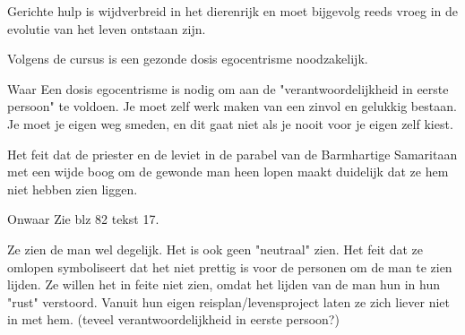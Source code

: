 \documentclass[main.tex]{subfiles}
\begin{document}
\begin{examenvraag}
    \begin{stelling}
        Gerichte hulp is wijdverbreid in het dierenrijk en moet bijgevolg reeds vroeg in de evolutie van het leven ontstaan zijn.
    \end{stelling}

    \begin{antwoord}
    \end{antwoord}
\end{examenvraag}


\begin{examenvraag}
    \begin{stelling}
        Volgens de cursus is een gezonde dosis egocentrisme noodzakelijk.
    \end{stelling}

	 \begin{stelling-antwoord}{Waar}
        Een dosis egocentrisme is nodig om aan de "verantwoordelijkheid in eerste persoon" te voldoen. 
        Je moet zelf werk maken van een zinvol en gelukkig bestaan. 
        Je moet je eigen weg smeden, en dit gaat niet als je nooit voor je eigen zelf kiest.
    \end{stelling-antwoord}
\end{examenvraag}


\begin{examenvraag}
    \begin{stelling}
        Het feit dat de priester en de leviet in de parabel van de Barmhartige Samaritaan met een wijde boog om de gewonde man heen lopen maakt duidelijk dat ze hem niet hebben zien liggen.
    \end{stelling}

	 \begin{stelling-antwoord}{Onwaar}
	   Zie blz 82 tekst 17.
	   
	   Ze zien de man wel degelijk. 
	   Het is ook geen "neutraal" zien.
	   Het feit dat ze omlopen symboliseert dat het niet prettig is voor de personen om de man te zien lijden.
	   Ze willen het in feite niet zien, omdat het lijden van de man hun in hun "rust" verstoord. 
	   Vanuit hun eigen reisplan/levensproject laten ze zich liever niet in met hem. 
	   (teveel verantwoordelijkheid in eerste persoon?)
	 
    \end{stelling-antwoord}
\end{examenvraag}
\end{document}
